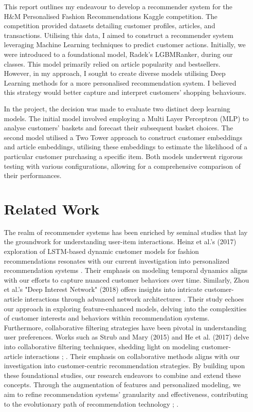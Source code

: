 \documentclass[conference,compsoc]{IEEEtran}
\begin{document}
This report outlines my endeavour to develop a recommender system for the H\&M Personalised Fashion Recommendations Kaggle competition. The competition provided datasets detailing customer profiles, articles, and transactions. Utilising this data, I aimed to construct a recommender system leveraging Machine Learning techniques to predict customer actions. Initially, we were introduced to a foundational model, Radek’s LGBMRanker, during our classes. This model primarily relied on article popularity and bestsellers. However, in my approach, I sought to create diverse models utilising Deep Learning methods for a more personalised recommendation system. I believed this strategy would better capture and interpret customers' shopping behaviours.

In the project, the decision was made to evaluate two distinct deep learning models. The initial model involved employing a Multi Layer Perceptron (MLP) to analyse customers' baskets and forecast their subsequent basket choices. The second model utilised a Two Tower approach to construct customer embeddings and article embeddings, utilising these embeddings to estimate the likelihood of a particular customer purchasing a specific item. Both models underwent rigorous testing with various configurations, allowing for a comprehensive comparison of their performances.

\section{Related Work}
The realm of recommender systems has been enriched by seminal studies that lay the groundwork for understanding user-item interactions. Heinz et al.'s (2017) exploration of LSTM-based dynamic customer models for fashion recommendations resonates with our current investigation into personalized recommendation systems \cite{heinz2017lstmbased}. Their emphasis on modeling temporal dynamics aligns with our efforts to capture nuanced customer behaviors over time. Similarly, Zhou et al.'s "Deep Interest Network" (2018) offers insights into intricate customer-article interactions through advanced network architectures \cite{zhou2018deep}. Their study echoes our approach in exploring feature-enhanced models, delving into the complexities of customer interests and behaviors within recommendation systems.
Furthermore, collaborative filtering strategies have been pivotal in understanding user preferences. Works such as Strub and Mary (2015) and He et al. (2017) delve into collaborative filtering techniques, shedding light on modeling customer-article interactions \cite{strub:hal-01256422}; \cite{he2017neural}. Their emphasis on collaborative methods aligns with our investigation into customer-centric recommendation strategies. By building upon these foundational studies, our research endeavors to combine and extend these concepts. Through the augmentation of features and personalized modeling, we aim to refine recommendation systems' granularity and effectiveness, contributing to the evolutionary path of recommendation technology \cite{he2017neural}; \cite{strub:hal-01256422}.
\end{document}
